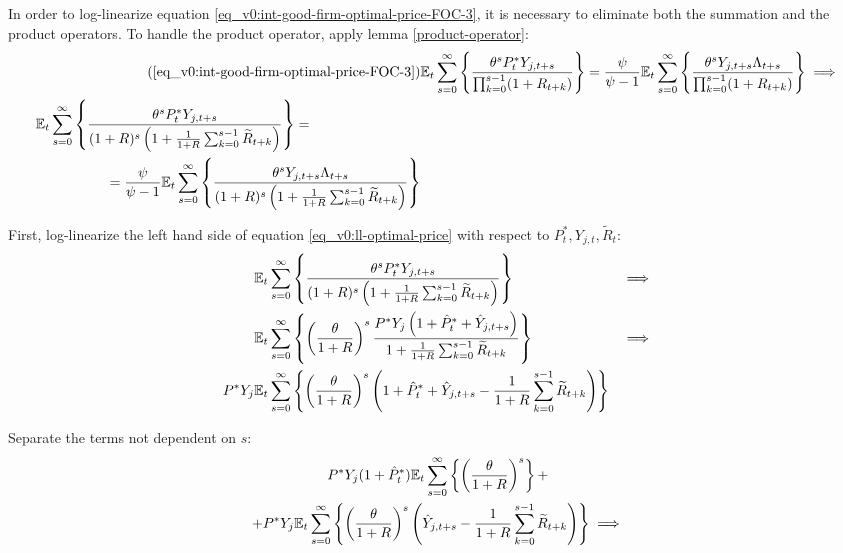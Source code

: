 \documentclass[../thesis.tex]{subfiles}
\begin{document}
	In order to log-linearize equation \ref{eq_v0:int-good-firm-optimal-price-FOC-3}, it is necessary to eliminate both the summation and the product operators. To handle the product operator, apply lemma \ref{product-operator}:
	\begin{align}
		\tag{\ref{eq_v0:int-good-firm-optimal-price-FOC-3}}
		& \E \sum_{s=0}^{\infty} \left\{ \frac{\theta^s P_t^\ast Y_{j,t+s} }{ \prod_{k=0}^{s-1}(1+R_{t+k})} \right\} = \frac{\psi}{\psi-1} \E \sum_{s=0}^{\infty} \left\{ \frac{\theta^s Y_{j,t+s} \Lambda_{t+s}}{\prod_{k=0}^{s-1}(1+R_{t+k})} \right\} \implies
		\\
		\begin{split}
			& \E \sum_{s=0}^{\infty} \left\{ \frac{\theta^s P_t^\ast Y_{j,t+s}}{ (1 + R)^s \left( 1 + \frac{1}{1 + R} \sum_{k=0}^{s-1} \widetilde{R}_{t+k} \right) } \right\} = 
			\\ & \quad \quad \quad \quad \quad = \frac{\psi}{\psi-1} \E \sum_{s=0}^{\infty} \left\{ \frac{\theta^s Y_{j,t+s} \Lambda_{t+s}}{ (1 + R)^s \left( 1 + \frac{1}{1 + R} \sum_{k=0}^{s-1} \widetilde{R}_{t+k} \right) } \right\} \label{eq_v0:ll-optimal-price}
		\end{split}
	\end{align}
	
	First, log-linearize the left hand side of equation \ref{eq_v0:ll-optimal-price} with respect to \( P_t^\ast, Y_{j,t}, \widetilde{R}_t \):
	\begin{alignat}{2}
		& {\mathbb{E}_{t}} \sum_{s=0}^{\infty} \left\{ \frac{\theta^s P_t^\ast Y_{j,t+s}}{ (1 + R)^s \left( 1 + \frac{1}{1 + R} \sum_{k=0}^{s-1} \widetilde{R}_{t+k} \right) } \right\} &\implies \nonumber \\
		& {\mathbb{E}_{t}} \sum_{s=0}^{\infty} \left\{ \left( \frac{\theta}{1 + R} \right)^s  \frac{ P^\ast Y_{j} \left( 1 + \hat{P}_t^\ast + \hat{Y}_{j,t+s} \right) }{ 1 + \frac{1}{1 + R} \sum_{k=0}^{s-1} \widetilde{R}_{t+k} } \right\} &\implies \nonumber \\
		P^\ast Y_{j} &{\mathbb{E}_{t}} \sum_{s=0}^{\infty} \left\{ \left( \frac{\theta}{1 + R} \right)^s \left( 1 + \hat{P}_t^\ast + \hat{Y}_{j,t+s} - \frac{1}{1 + R} \sum_{k=0}^{s-1} \widetilde{R}_{t+k} \right) \right\} & \nonumber
	\end{alignat}
	
	Separate the terms not dependent on $s$:
	\begin{multline}
		P^\ast Y_{j} ( 1 + \hat{P}_t^\ast ) {\mathbb{E}_{t}} \sum_{s=0}^{\infty} \left\{ \left( \frac{\theta}{1 + R} \right)^s \right\} + \\
		+ P^\ast Y_{j} {\mathbb{E}_{t}} \sum_{s=0}^{\infty} \left\{ \left( \frac{\theta}{1 + R} \right)^s \left( \hat{Y}_{j,t+s} - \frac{1}{1 + R} \sum_{k=0}^{s-1} \widetilde{R}_{t+k} \right) \right\} \implies \nonumber
	\end{multline}
	
\end{document}
